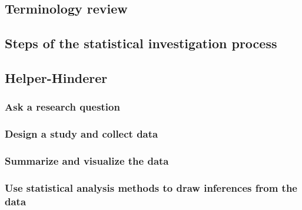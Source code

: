 \documentclass[
]{report}
\begin{document}
\hypertarget{terminology-review-8}{%
\subsection{Terminology review}\label{terminology-review-8}}

\hypertarget{steps-of-the-statistical-investigation-process-1}{%
\subsection{Steps of the statistical investigation process}\label{steps-of-the-statistical-investigation-process-1}}

\hypertarget{helper-hinderer}{%
\subsection{Helper-Hinderer}\label{helper-hinderer}}

\hypertarget{ask-a-research-question}{%
\subsubsection*{Ask a research question}\label{ask-a-research-question}}

\hypertarget{design-a-study-and-collect-data}{%
\subsubsection*{Design a study and collect data}\label{design-a-study-and-collect-data}}

\hypertarget{summarize-and-visualize-the-data}{%
\subsubsection*{Summarize and visualize the data}\label{summarize-and-visualize-the-data}}

\hypertarget{use-statistical-analysis-methods-to-draw-inferences-from-the-data}{%
\subsubsection*{Use statistical analysis methods to draw inferences from the data}\label{use-statistical-analysis-methods-to-draw-inferences-from-the-data}}
\end{document}
